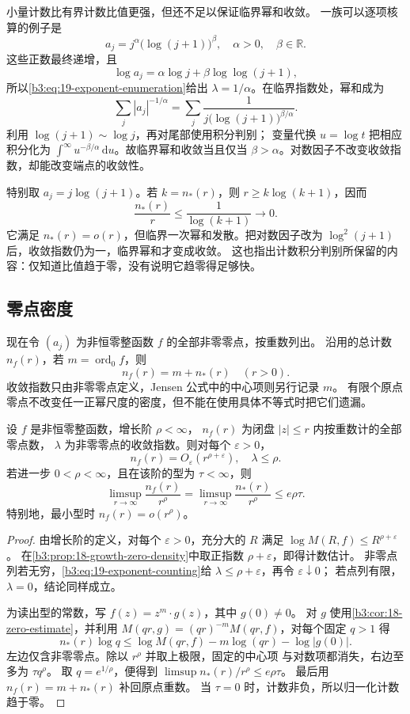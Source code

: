 小量计数比有界计数比值更强，但还不足以保证临界幂和收敛。
一族可以逐项核算的例子是
\[
 a_j=j^\alpha\bigl(\log(j+1)\bigr)^\beta,
 \quad \alpha>0,\quad \beta\in\mathbb R.
\]
这些正数最终递增，且
\[
 \log a_j=\alpha\log j+\beta\log\log(j+1),
\]
所以\eqref{b3:eq:19-exponent-enumeration}给出
\(\lambda=1/\alpha\)。在临界指数处，幂和成为
\[
 \sum_j|a_j|^{-1/\alpha}
 =\sum_j\frac1{j\bigl(\log(j+1)\bigr)^{\beta/\alpha}}.
\]
利用 \(\log(j+1)\sim\log j\)，再对尾部使用积分判别；
变量代换 \(u=\log t\) 把相应积分化为
\(\int^\infty u^{-\beta/\alpha}\,\mathrm du\)。故临界幂和收敛当且仅当
\(\beta>\alpha\)。对数因子不改变收敛指数，却能改变端点的收敛性。

\ProseParagraphBreak
特别取 \(a_j=j\log(j+1)\)。若 \(k=n_*(r)\)，则
\(r\ge k\log(k+1)\)，因而
\[
 \frac{n_*(r)}r\le\frac1{\log(k+1)}\longrightarrow0.
\]
它满足 \(n_*(r)=o(r)\)，但临界一次幂和发散。把对数因子改为
\(\log^2(j+1)\) 后，收敛指数仍为一，临界幂和才变成收敛。
这也指出计数积分判别所保留的内容：仅知道比值趋于零，没有说明它趋零得足够快。

\subsection{零点密度}
\label{b3:subsec:190302}

现在令 \((a_j)\) 为非恒零整函数 \(f\) 的全部非零零点，按重数列出。
沿用的总计数 \(n_f(r)\)，若
\(m=\operatorname{ord}_0f\)，则
\[
 n_f(r)=m+n_*(r)\quad(r>0).
\]
收敛指数只由非零零点定义，Jensen 公式中的中心项则另行记录 \(m\)。
有限个原点零点不改变任一正幂尺度的密度，但不能在使用具体不等式时把它们遗漏。

\begin{proposition}[增长阶与零点密度]\label{b3:prop:19-zero-density}
设 \(f\) 是非恒零整函数，增长阶 \(\rho<\infty\)，
\(n_f(r)\) 为闭盘 \(|z|\le r\) 内按重数计的全部零点数，
\(\lambda\) 为非零零点的收敛指数。则对每个 \(\varepsilon>0\)，
\[
 n_f(r)=O_\varepsilon(r^{\rho+\varepsilon}),\quad
 \lambda\le\rho.
\]
若进一步 \(0<\rho<\infty\)，且在该阶的型为 \(\tau<\infty\)，则
\[
 \limsup_{r\to\infty}\frac{n_f(r)}{r^\rho}
 =\limsup_{r\to\infty}\frac{n_*(r)}{r^\rho}
 \le e\rho\tau.
\]
特别地，最小型时 \(n_f(r)=o(r^\rho)\)。
\end{proposition}
\begin{proof}
由增长阶的定义，对每个 \(\varepsilon>0\)，充分大的 \(R\) 满足
\(\log M(R,f)\le R^{\rho+\varepsilon}\)。
在\cref{b3:prop:18-growth-zero-density}中取正指数
\(\rho+\varepsilon\)，即得计数估计。
非零点列若无穷，\eqref{b3:eq:19-exponent-counting}给
\(\lambda\le\rho+\varepsilon\)，再令 \(\varepsilon\downarrow0\)；
若点列有限，\(\lambda=0\)，结论同样成立。

为读出型的常数，写 \(f(z)=z^m\cdot g(z)\)，其中 \(g(0)\ne0\)。
对 \(g\) 使用\cref{b3:cor:18-zero-estimate}，并利用
\(M(qr,g)=(qr)^{-m}M(qr,f)\)，对每个固定 \(q>1\) 得
\[
 n_*(r)\log q
 \le\log M(qr,f)-m\log(qr)-\log|g(0)|.
\]
左边仅含非零零点。除以 \(r^\rho\) 并取上极限，固定的中心项
与对数项都消失，右边至多为 \(\tau q^\rho\)。
取 \(q=e^{1/\rho}\)，便得到
\(\limsup n_*(r)/r^\rho\le e\rho\tau\)。
最后用 \(n_f(r)=m+n_*(r)\) 补回原点重数。
当 \(\tau=0\) 时，计数非负，所以归一化计数趋于零。
\end{proof}

